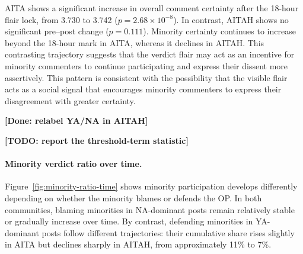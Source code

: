 AITA shows a significant increase in overall comment certainty after the 18-hour flair lock, from 3.730 to 3.742 (\(p=2.68\times10^{-8}\)). In contrast, AITAH shows no significant pre–post change (\(p=0.111\)). Minority certainty continues to increase beyond the 18-hour mark in AITA, whereas it declines in AITAH. This contrasting trajectory suggests that the verdict flair may act as an incentive for minority commenters to continue participating and express their dissent more assertively. This pattern is consistent with the possibility that the visible flair acts as a social signal that encourages minority commenters to express their disagreement with greater certainty.

\textbf{[Done: relabel YA/NA in AITAH]}

\textbf{[TODO: report the threshold-term statistic]}


\paragraph{Minority verdict ratio over time.}
Figure~\ref{fig:minority-ratio-time} shows minority participation develops differently depending on whether the minority blames or defends the OP. In both communities, blaming minorities in NA-dominant posts remain relatively stable or gradually increase over time. By contrast, defending minorities in YA-dominant posts follow different trajectories: their cumulative share rises slightly in AITA but declines sharply in AITAH, from approximately 11\% to 7\%.



